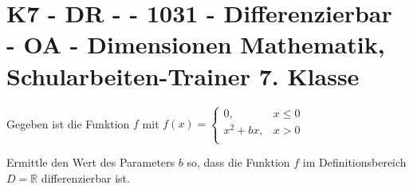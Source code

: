 \section{K7 - DR -  - 1031 - Differenzierbar - OA - Dimensionen Mathematik, Schularbeiten-Trainer 7. Klasse}

\begin{beispiel}[K7 - DR]{1} %
Gegeben ist die Funktion $f$ mit $f(x)=\begin{cases}0,&x\leq 0\\
x^2+bx,&x>0\\
\end{cases}$

Ermittle den Wert des Parameters $b$ so, dass die Funktion $f$ im Definitionsbereich $D=\mathbb{R}$ differenzierbar ist.\leer

				
				\end{beispiel}
